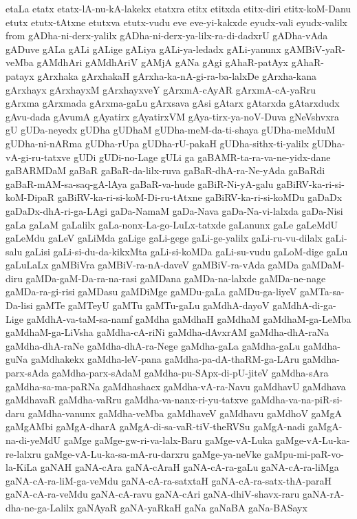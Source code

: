 {etaLa
etatx
etatx-lA-nu-kA-lakekx
etatxra
etitx
etitxda
etitx-diri
etitx-koM-Danu
etutx
etutx-tAtxne
etutxva
etutx-vudu
eve
eve-yi-kakxde
eyudx-vali
eyudx-valilx
from
gADha-ni-derx-yalilx
gADha-ni-derx-ya-lilx-ra-di-dadxrU
gADha-vAda
gADuve
gALa
gALi
gALige
gALiya
gALi-ya-ledadx
gALi-yanunx
gAMBiV-yaR-veMba
gAMdhAri
gAMdhAriV
gAMjA
gANa
gAgi
gAhaR-patAyx
gAhaR-patayx
gArxhaka
gArxhakaH
gArxha-ka-nA-gi-ra-ba-lalxDe
gArxha-kana
gArxhayx
gArxhayxM
gArxhayxveY
gArxmA-cAyAR
gArxmA-cA-yaRru
gArxma
gArxmada
gArxma-gaLu
gArxsava
gAsi
gAtarx
gAtarxda
gAtarxdudx
gAvu-dada
gAvumA
gAyatirx
gAyatirxVM
gAya-tirx-ya-noV-Duva
gNeVshvxra
gU
gUDa-neyedx
gUDha
gUDhaM
gUDha-meM-da-ti-shaya
gUDha-meMduM
gUDha-ni-nARma
gUDha-rUpa
gUDha-rU-pakaH
gUDha-sithx-ti-yalilx
gUDha-vA-gi-ru-tatxve
gUDi
gUDi-no-Lage
gULi
ga
gaBAMR-ta-ra-va-ne-yidx-dane
gaBARMDaM
gaBaR
gaBaR-da-lilx-ruva
gaBaR-dhA-ra-Ne-yAda
gaBaRdi
gaBaR-mAM-sa-saq-gA-lAya
gaBaR-va-hude
gaBiR-Ni-yA-galu
gaBiRV-ka-ri-si-koM-DipaR
gaBiRV-ka-ri-si-koM-Di-ru-tAtxne
gaBiRV-ka-ri-si-koMDu
gaDaDx
gaDaDx-dhA-ri-ga-LAgi
gaDa-NamaM
gaDa-Nava
gaDa-Na-vi-lalxda
gaDa-Nisi
gaLa
gaLaM
gaLalilx
gaLa-nonx-La-go-LuLx-tatxde
gaLanunx
gaLe
gaLeMdU
gaLeMdu
gaLeV
gaLiMda
gaLige
gaLi-gege
gaLi-ge-yalilx
gaLi-ru-vu-dilalx
gaLi-salu
gaLisi
gaLi-si-du-da-kikxMta
gaLi-si-koMDa
gaLi-su-vudu
gaLoM-dige
gaLu
gaLuLaLx
gaMBiVra
gaMBiV-ra-nA-daveV
gaMBiV-ra-vAda
gaMDa
gaMDaM-diru
gaMDa-gaM-Da-ra-na-rasi
gaMDana
gaMDa-na-lalxde
gaMDa-ne-nage
gaMDa-ra-gi-risi
gaMDasu
gaMDiMge
gaMDu-gaLa
gaMDu-ga-liyeV
gaMTa-sa-Da-lisi
gaMTe
gaMTeyU
gaMTu
gaMTu-gaLu
gaMdhA-dayoV
gaMdhA-di-ga-Lige
gaMdhA-va-taM-sa-namf
gaMdha
gaMdhaH
gaMdhaM
gaMdhaM-ga-LeMba
gaMdhaM-ga-LiVsha
gaMdha-cA-riNi
gaMdha-dAvxrAM
gaMdha-dhA-raNa
gaMdha-dhA-raNe
gaMdha-dhA-ra-Nege
gaMdha-gaLa
gaMdha-gaLu
gaMdha-guNa
gaMdhakekx
gaMdha-leV-pana
gaMdha-pa-dA-thaRM-ga-LAru
gaMdha-parx-sAda
gaMdha-parx-sAdaM
gaMdha-pu-SApx-di-pU-jiteV
gaMdha-sAra
gaMdha-sa-ma-paRNa
gaMdhashacx
gaMdha-vA-ra-Navu
gaMdhavU
gaMdhava
gaMdhavaR
gaMdha-vaRru
gaMdha-va-nanx-ri-yu-tatxve
gaMdha-va-na-piR-si-daru
gaMdha-vanunx
gaMdha-veMba
gaMdhaveV
gaMdhavu
gaMdhoV
gaMgA
gaMgAMbi
gaMgA-dharA
gaMgA-di-sa-vaR-tiV-theRVSu
gaMgA-nadi
gaMgA-na-di-yeMdU
gaMge
gaMge-gw-ri-va-lalx-Baru
gaMge-vA-Luka
gaMge-vA-Lu-ka-re-lalxru
gaMge-vA-Lu-ka-sa-mA-ru-darxru
gaMge-ya-neVke
gaMpu-mi-paR-vo-la-KiLa
gaNAH
gaNA-cAra
gaNA-cAraH
gaNA-cA-ra-gaLu
gaNA-cA-ra-liMga
gaNA-cA-ra-liM-ga-veMdu
gaNA-cA-ra-satxtaH
gaNA-cA-ra-satx-thA-paraH
gaNA-cA-ra-veMdu
gaNA-cA-ravu
gaNA-cAri
gaNA-dhiV-shavx-raru
gaNA-rA-dha-ne-ga-Lalilx
gaNAyaR
gaNA-yaRkaH
gaNa
gaNaBA
gaNa-BASayx
}
